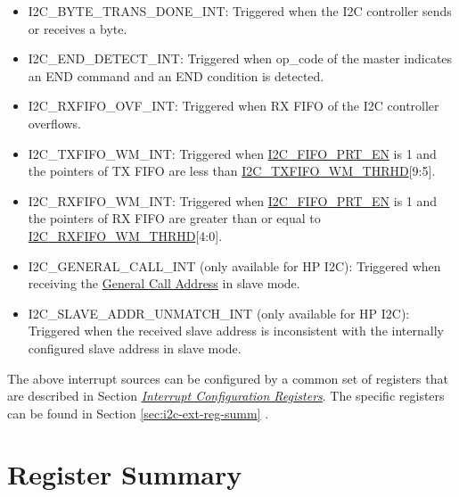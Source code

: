 \documentclass[main\_\_EN.tex]{subfiles}
\begin{document}
\begin{itemize}
\item \label{int:i2c-byte-trans-done}I2C\_BYTE\_TRANS\_DONE\_INT: Triggered when the I2C controller sends or receives a byte.
\item \label{int:i2c-end}I2C\_END\_DETECT\_INT: Triggered when op\_code of the master indicates an END command and an END condition is detected.
\item \label{int:i2c-rxfifo-ovf}I2C\_RXFIFO\_OVF\_INT: Triggered when RX FIFO of the I2C controller overflows.
\item \label{int:i2c-txfifo-wm}I2C\_TXFIFO\_WM\_INT: Triggered when \hyperref[fielddesc:I2CFIFOPRTEN]{I2C\_FIFO\_PRT\_EN} is 1 and the pointers of TX FIFO are less than \hyperref[fielddesc:I2CTXFIFOWMTHRHD]{I2C\_TXFIFO\_WM\_THRHD}[9:5].
\item \label{int:i2c-rxfifo-wm}I2C\_RXFIFO\_WM\_INT: Triggered when \hyperref[fielddesc:I2CFIFOPRTEN]{I2C\_FIFO\_PRT\_EN} is 1 and the pointers of RX FIFO are greater than or equal to \hyperref[fielddesc:I2CRXFIFOWMTHRHD]{I2C\_RXFIFO\_WM\_THRHD}[4:0].
\item \label{int:i2c-general-call}I2C\_GENERAL\_CALL\_INT (only available for HP I2C): Triggered when receiving the \href{https://www.csd.uoc.gr/~hy428/reading/i2c_spec.pdf#page=16}{General Call Address} in slave mode.
\item \label{int:i2c-slave-addr}I2C\_SLAVE\_ADDR\_UNMATCH\_INT (only available for HP I2C): Triggered when the received slave address is inconsistent with the internally configured slave address in slave mode.
\end{itemize}

The above interrupt sources can be configured by a common set of registers that are described in Section \hyperref[interrupt-config-registers]{\textit{Interrupt Configuration Registers}}. The specific registers can be found in Section \ref{sec:i2c-ext-reg-summ} \textit{}.




\newpage
\section{Register Summary}
\end{document}
